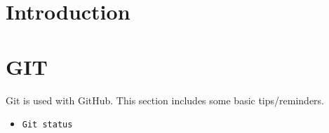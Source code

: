 \documentclass[10pt,a4paper]{report}
\author{Jeroen Keizer}
\begin{document}
\section{Introduction}
\section{GIT}
Git is used with GitHub.
This section includes some basic tips/reminders.
\begin{itemize}
\item \verb|Git status|
\end{itemize}
\end{document}
